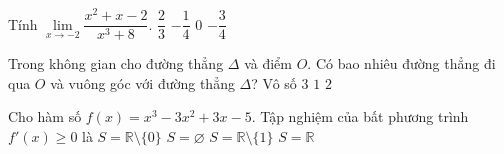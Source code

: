 \begin{ex}%
Tính $\lim\limits_{x\rightarrow -2}\dfrac{x^2+x-2}{x^3+8}$.
	\choice
	{$\dfrac{2}{3}$}
	{\True $-\dfrac{1}{4}$}
	{$0$}
	{$-\dfrac{3}{4}$}
\end{ex}

\begin{ex}%
	Trong không gian cho đường thẳng $\Delta$ và điểm $O$. Có bao nhiêu đường thẳng đi qua $O$ và vuông góc với đường thẳng $\Delta$?
	\choice
	{\True Vô số}
	{$3$}
	{$1$}
	{$2$}
\end{ex}

\begin{ex}%
	Cho hàm số $f(x)=x^3-3x^2+3x-5$. Tập nghiệm của bất phương trình $f'(x)\ge 0$ là
	\choice
	{$S=\mathbb{R} \setminus\{0\}$}
	{$S=\varnothing$}
	{$S=\mathbb{R} \setminus\{1\}$}
	{\True $S=\mathbb{R}$}
\end{ex}

